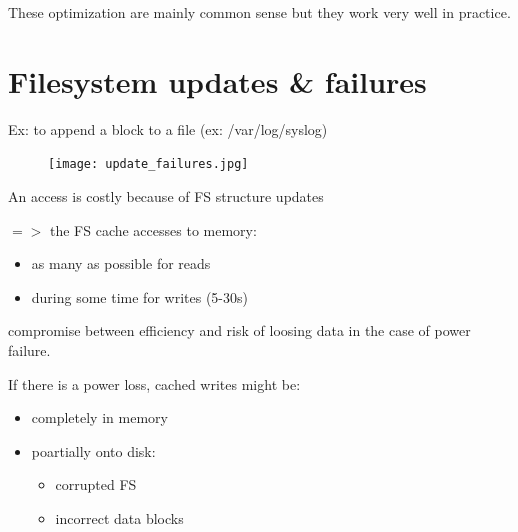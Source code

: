 \documentclass[a4paper,10pt]{report}
\begin{document}
These optimization are mainly common sense but they work very well in practice.

\section{Filesystem updates & failures}

Ex: to append a block to a file (ex: /var/log/syslog)

\begin{figure}[h!]
  \begin{center}
    \texttt{[image: update\_failures.jpg]}
  \end{center}
\end{figure}


An access is costly because of FS structure updates

$=>$ the FS cache accesses to memory:
\begin{itemize}
  \item as many as possible for reads
  \item during some time for writes (5-30s)
\end{itemize}
compromise between efficiency and risk of loosing data in the case of power failure.

If there is a power loss, cached writes might be:

\begin{itemize}
  \item completely in memory
  \item poartially onto disk:
    \begin{itemize}
      \item corrupted FS
      \item incorrect data blocks
    \end{itemize}
\end{itemize}
\end{document}
